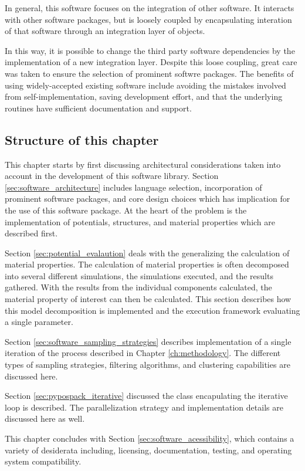 In general, this software focuses on the integration of other software.  It interacts with other software packages, but is loosely coupled by encapsulating interation of that software through an integration layer of objects.

In this way, it is possible to change the third party software dependencies by the implementation of a new integration layer.  Despite this loose coupling, great care was taken to ensure the selection of prominent softwre packages.  The benefits of using widely-accepted existing software include avoiding the mistakes involved from self-implementation, saving development effort, and that the underlying routines have sufficient documentation and support.

\subsection{Structure of this chapter}

This chapter starts by first discussing architectural considerations taken into account in the development of this software library.  Section \ref{sec:software_architecture} includes language selection, incorporation of prominent software packages, and core design choices which has implication for the use of this software package.  At the heart of the problem is the implementation of potentials, structures, and material properties which are described first.

Section \ref{sec:potential_evalaution} deals with the generalizing the calculation of material properties.  The calculation of material properties is often decomposed into several different simulations, the simulations executed, and the results gathered.  With the results from the individual components calculated, the material property of interest can then be calculated.  This section describes how this model decomposition is implemented and the execution framework evaluating a single parameter.

Section \ref{sec:software_sampling_strategies} describes implementation of a single iteration of the process described in Chapter \ref{ch:methodology}.  The different types of sampling strategies, filtering algorithms, and clustering capabilities are discussed here.

Section \ref{sec:pypospack_iterative} discussed the class encapulating the iterative loop is described.  The parallelization strategy and implementation details are discussed here as well.

This chapter concludes with Section \ref{sec:software_acessibility}, which contains a variety of desiderata including, licensing, documentation, testing, and operating system compatibility.

